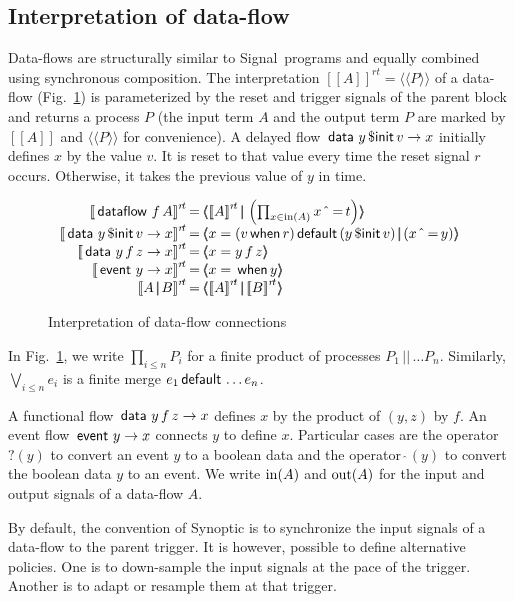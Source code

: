 \documentclass[copyright,creativecommons]{eptcs}
\newcommand{\signal}{{\sc Signal}}
\newcommand{\op}[1]{{\sf #1}}
\newcommand{\kw}[1]{{{\,\op{#1}\,}}}
\newcommand{\Pre}{\kw{\$ init}}
\newcommand{\Sync}{\kw{\mbox{$\hat{~}$}=}}
\newcommand{\Default}{\kw{default}}
\newcommand{\When}{\kw{when}}
\newcommand{\Par}{{\,|\!\!|\,}}
\newcommand{\In}{{\rm{in}}}
\newcommand{\Out}{{\rm{out}}}
\newcommand{\ra}{\rightarrow}
\newcommand{\Sq}[1]{{[\![{#1}]\!]}}
\renewcommand{\:}{{:}}
\newcommand{\sq}[1]{\langle\!\!\langle{#1}\rangle\!\!\rangle}
\newcommand{\Data}{{\kw{data}}}
\newcommand{\Dataflow}{{\kw{dataflow}}}
\newcommand{\Event}{{\kw{event}}}
\begin{document}
\subsection{Interpretation of data-flow}

Data-flows are structurally similar to \signal\ programs and equally combined using synchronous composition. The interpretation $\Sq{A}^{rt}=\sq{P}$ of a data-flow (Fig.~\ref{fig2}) is parameterized by the reset and trigger signals of the parent block and returns a process $P$ (the input term $A$ and the output term $P$ are marked by $\Sq{A}$ and $\sq{P}$ for convenience). A delayed flow $\Data\,y\Pre v\ra x$ initially defines $x$ by the value $v$. It is reset to that value every time the reset signal $r$ occurs. Otherwise, it takes the  previous value of $y$ in time.





\begin{figure}[h!]
\hrulefill
\[
\begin{array}{@{}r@{\,}c@{\,}l@{}}
\Sq{\Dataflow\,f\,A}^{r\!t}&=&\sq{\Sq{A}^{r\!t}\Par \left(\prod_{x\in\In(A)} x\Sync t\right)}\\
\Sq{\Data\,y\Pre v\ra x}^{r\!t}&=&\sq{x=(v\When r)\Default (y\Pre v)\Par (x\Sync y)}\\
\Sq{\Data\,y\,f\,z\ra x}^{r\!t}&=&\sq{x=y\,f\,z}\\
\Sq{\Event\,y\ra x}^{r\!t}&=&\sq{x=\When y}\\
\Sq{A\Par B}^{r\!t}&=&\sq{\Sq{A}^{r\!t}\Par\Sq{B}^{r\!t}}
\end{array}
\]
\hrulefill
\caption{Interpretation of data-flow connections}\label{fig2}
\end{figure}


In Fig.~\ref{fig2}, we write $\prod_{i\leq n}P_i$ for a finite product of processes $P_1\Par\dots P_n$. Similarly,
$\bigvee_{i\leq n} e_i$ is a finite merge $e_1\Default\dots e_n$.


A functional flow $\Data\,y\,f\,z\ra x$ defines $x$ by the product of $(y,z)$ by $f$.  An event flow $\Event\,y\ra x$ connects $y$ to define $x$. Particular cases are the operator $?(y)$ to convert an event $y$ to a boolean data and the operator $\hat{~}(y)$ to convert the boolean data $y$ to an event. We write $\In(A)$ and $\Out(A)$ for the input and output signals of a data-flow $A$.

By default, the convention of Synoptic is to synchronize the input signals of a data-flow to the parent trigger. It is however, possible to define alternative policies.
One is to down-sample the input signals at the pace of the trigger.  Another is to adapt or resample them at that trigger.
\end{document}
